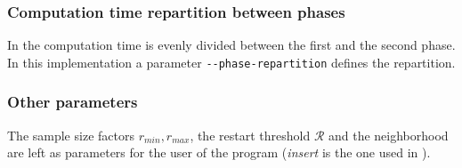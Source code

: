 \subsubsection{Computation time repartition between phases}

In \cite{santostabu} the computation time is evenly divided between the first and the second phase. In this implementation a parameter \verb!--phase-repartition! defines the repartition.

\subsubsection{Other parameters}

The sample size factors $r_{min}, r_{max}$, the restart threshold $\mathcal{R}$ and the neighborhood are left as parameters for the user of the program (\emph{insert} is the one used in \cite{santostabu}).
